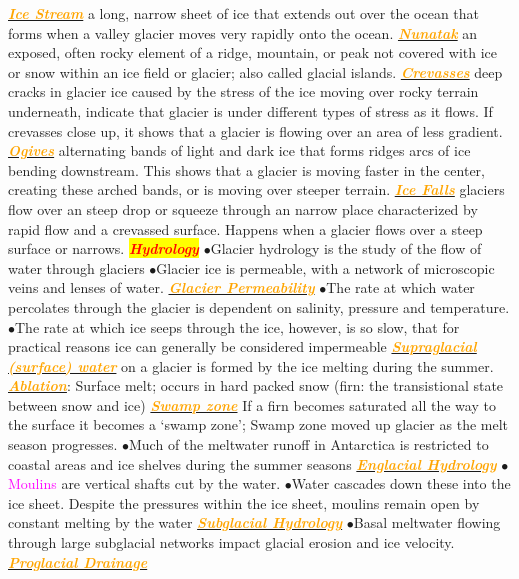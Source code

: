 \documentclass{article}
\newcommand{\ddd}{$\bullet$}
\newcommand{\red}[1]{\textcolor{red}{#1}}
\newcommand{\pink}[1]{\textcolor{magenta}{#1}}
\newcommand{\orange}[1]{\textcolor{orange}{#1}}
\newcommand{\mysection}[1]{\colorbox{yellow}{{\textbf{\textbf{\textit{\red{#1}}}}}}}
\newcommand{\mysub}[1]{\underline{\textbf{{\textit{\orange{#1}}}}}}
\newcommand{\vocab}[1]{{\pink{#1}}}
\begin{document}
\begin{multicols*}{4}
		\mysub{Ice Stream} a long, narrow sheet of ice that extends out over the ocean that forms when a valley glacier moves very rapidly onto the ocean.
		\mysub{Nunatak} an exposed, often rocky element of a ridge, mountain, or peak not covered with ice or snow within an ice field or glacier; also called glacial islands.
		\mysub{Crevasses} deep cracks in glacier ice caused by the stress of the ice moving over rocky terrain underneath, indicate that glacier is under different types of stress as it flows. If crevasses close up, it shows that a glacier is flowing over an area of less gradient. 
		\mysub{Ogives} alternating bands of light and dark ice that forms ridges arcs of ice bending downstream. This shows that a glacier is moving faster in the center, creating these arched bands, or is moving over steeper terrain.
		\mysub{Ice Falls} glaciers flow over an steep drop or squeeze through an narrow place characterized by rapid flow and a crevassed surface. Happens when a glacier flows over a steep surface or narrows.
	    \mysection{Hydrology}
	        \ddd Glacier hydrology is the study of the flow of water through glaciers
            \ddd Glacier ice is permeable, with a network of microscopic veins and lenses of water.
            \mysub{Glacier Permeability} 
                \ddd The rate at which water percolates through the glacier is dependent on salinity, pressure and temperature. 
                \ddd  The rate at which ice seeps through the ice, however, is so slow, that for practical reasons ice can generally be considered impermeable
            \mysub{Supraglacial (surface) water} on a glacier is formed by the ice melting during the summer.
            \mysub{Ablation}: Surface melt; occurs in hard packed snow (firn: the transistional state between snow and ice)
            \mysub{Swamp zone} If a firn becomes saturated all the way to the surface it becomes a ‘swamp zone’; Swamp zone moved up glacier as the melt season progresses.
            \ddd Much of the meltwater runoff in Antarctica is restricted to coastal areas and ice shelves during the summer seasons
            \mysub{Englacial Hydrology}
                \ddd \vocab{Moulins} are vertical shafts cut by the water.
                \ddd Water cascades down these into the ice sheet. Despite the pressures within the ice sheet, moulins remain open by constant melting by the water
            \mysub{Subglacial Hydrology}
                \ddd Basal meltwater flowing through large subglacial networks impact glacial erosion and ice velocity. 
            \mysub{Proglacial Drainage}

\end{multicols*}
\end{document}

